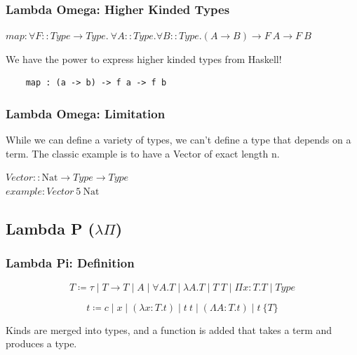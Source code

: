 \documentclass{beamer}
\newcommand{\nat}{\text{Nat}}
\begin{document}
\begin{frame}[fragile]
  \frametitle{Lambda Omega: Higher Kinded Types}

  $map : \forall F :: Type \rightarrow Type . \ \forall A :: Type . \forall B :: Type . (A \rightarrow B) \rightarrow F\ A \rightarrow F\ B$

  \vspace{1cm}

  We have the power to express higher kinded types from Haskell!

  \begin{lstlisting}
    map : (a -> b) -> f a -> f b
  \end{lstlisting}

\end{frame}

\begin{frame}[fragile]
  \frametitle{Lambda Omega: Limitation}

  While we can define a variety of types, we can't define a type that depends on a term.
  The classic example is to have a Vector of exact length n.

  \vspace{1cm}

  $Vector :: \nat \rightarrow Type \rightarrow Type $ \\
  $example: Vector\ 5\ \nat$

\end{frame}

\subsection{Lambda P ($\lambda \Pi$)}

\begin{frame}
  \frametitle{Lambda Pi: Definition}

  $$
    T \coloneqq \tau
      \mid T \rightarrow T
      \mid A
      \mid \forall A . T
      \mid \lambda A . T
      \mid T\ T
      \mid \Pi x : T . T
      \mid Type
  $$

  $$
    t \coloneqq c
      \mid x
      \mid (\lambda x : T . t)
      \mid t\ t
      \mid (\Lambda A : T . t)
      \mid t\ \{T\}
  $$

  \vspace{5mm}

  Kinds are merged into types, and a function is added that takes a term and produces a type.

\end{frame}
\end{document}
